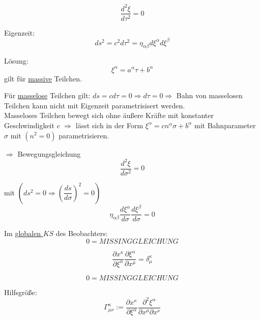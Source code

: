 \documentclass[a4paper, 11pt]{article}
\numberwithin{equation}{section}
\begin{document}
\begin{equation}
\dfrac{d^2 \xi}{d \tau^2} = 0
\end{equation}

Eigenzeit:
\begin{equation}
ds^2 = c^2 d\tau^2 = \eta_{\alpha \beta} d \xi^\alpha d \xi^\beta
\end{equation}

Lösung:
\begin{equation}
\xi^\alpha = a^\alpha \tau + b^\alpha
\end{equation}
gilt für \underline{massive} Teilchen.

Für \underline{masselose} Teilchen gilt: $ds = cd\tau = 0 \Rightarrow d \tau = 0 \Rightarrow$ Bahn von masselosen Teilchen kann nicht mit Eigenzeit parametrisisert werden.\\
Masseloses Teilchen bewegt sich ohne äußere Kräfte mit konstanter Geschwindigkeit $c$ $\Rightarrow$ lässt sich in der Form $\xi^\alpha =c n^\alpha \sigma + b^\alpha$ mit Bahnparameter $\sigma$ mit $(n^2 = 0)$ parametrisieren.

$\Rightarrow$ Bewegungsgleichung
\begin{equation}
\dfrac{d^2\xi}{d\sigma^2} = 0
\end{equation}

mit $(ds^2 = 0 \Rightarrow \left( \dfrac{ds}{d\sigma} \right) ^2 = 0)$
\begin{equation}
\eta_{\alpha \beta} \dfrac{d\xi^\alpha}{d\sigma} \dfrac{d\xi^\beta}{d\sigma} =0
\end{equation}


Im \underline{globalen $KS$} des Beobachters:
\begin{equation}
0 = MISSING GLEICHUNG
\end{equation}

\begin{equation}
\dfrac{\partial x^\kappa}{\partial \xi^\alpha} \dfrac{\partial \xi^\alpha}{\partial x^\mu} = \delta^\kappa_\mu
\end{equation}

\begin{equation}
0 = MISSING GLEICHUNG
\end{equation}

Hilfsgröße:
\begin{equation}
\Gamma^\kappa_{\mu \nu} := \dfrac{\partial x^\kappa}{\partial \xi^\alpha} \dfrac{\partial^2 \xi^\alpha}{\partial x^\mu \partial x^\nu}
\end{equation}
\end{document}
